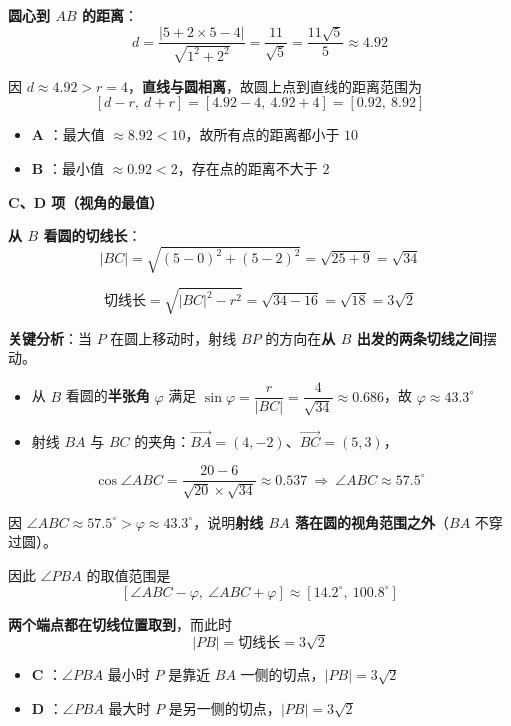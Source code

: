 \textbf{圆心到 $AB$ 的距离}：
\[d=\frac{|5+2\times5-4|}{\sqrt{1^{2}+2^{2}}}=\frac{11}{\sqrt5}=\frac{11\sqrt5}5\approx4.92\]

因 $d\approx4.92>r=4$，\textbf{直线与圆相离}，故圆上点到直线的距离范围为
\[[d-r,\ d+r]=[4.92-4,\ 4.92+4]=[0.92,\ 8.92]\]

\begin{itemize}
\item \textbf{A }：最大值 $\approx8.92<10$，故所有点的距离都小于 $10$ 
\item \textbf{B }：最小值 $\approx0.92<2$，存在点的距离不大于 $2$ 
\end{itemize}

\par\medskip

\textbf{C、D 项（视角的最值）}

\textbf{从 $B$ 看圆的切线长}：
\[|BC|=\sqrt{(5-0)^{2}+(5-2)^{2}}=\sqrt{25+9}=\sqrt{34}\]

\[\text{切线长}=\sqrt{|BC|^{2}-r^{2}}=\sqrt{34-16}=\sqrt{18}=3\sqrt2\]

\textbf{关键分析}：当 $P$ 在圆上移动时，射线 $BP$ 的方向在\textbf{从 $B$ 出发的两条切线之间}摆动。

\begin{itemize}
\item 从 $B$ 看圆的\textbf{半张角} $\varphi$ 满足 $\sin\varphi=\dfrac r{|BC|}=\dfrac4{\sqrt{34}}\approx0.686$，故 $\varphi\approx43.3^\circ$
\item 射线 $BA$ 与 $BC$ 的夹角：$\overrightarrow{BA}=(4,-2)$、$\overrightarrow{BC}=(5,3)$，
\end{itemize}
\[\cos\angle ABC=\frac{20-6}{\sqrt{20}\times\sqrt{34}}\approx0.537\ \Longrightarrow\ \angle ABC\approx57.5^\circ\]

因 $\angle ABC\approx57.5^\circ>\varphi\approx43.3^\circ$，说明\textbf{射线 $BA$ 落在圆的视角范围之外}（$BA$ 不穿过圆）。

因此 $\angle PBA$ 的取值范围是
\[\left[\angle ABC-\varphi,\ \angle ABC+\varphi\right]\approx\left[14.2^\circ,\ 100.8^\circ\right]\]

\textbf{两个端点都在切线位置取到}，而此时
\[|PB|=\text{切线长}=3\sqrt2\]

\begin{itemize}
\item \textbf{C }：$\angle PBA$ 最小时 $P$ 是靠近 $BA$ 一侧的切点，$|PB|=3\sqrt2$ 
\item \textbf{D }：$\angle PBA$ 最大时 $P$ 是另一侧的切点，$|PB|=3\sqrt2$ 
\end{itemize}

